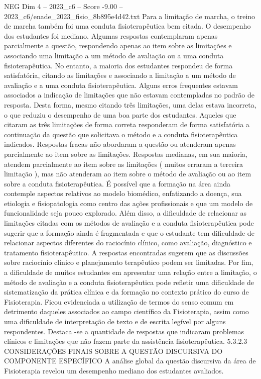 \begin{textsample}{NEG Dim 4 – 2023\_c6 – Score -9.00 – 2023\_c6/enade\_2023\_fisio\_8b895e4d42.txt}
Para a limitação de marcha, o treino de marcha também foi uma conduta fisioterapêutica bem citada.
O desempenho dos estudantes foi mediano.
Algumas respostas contemplaram apenas parcialmente a questão, respondendo apenas ao item sobre as limitações e associando uma limitação a um método de avaliação ou a uma conduta fisioterapêutica.
No entanto, a maioria dos estudantes respondeu de forma satisfatória, citando as limitações e associando a limitação a um método de avaliação e a uma conduta fisioterapêutica.
Alguns erros frequentes estavam associados a indicação de limitações que não estavam contempladas no padrão de resposta.
Desta forma, mesmo citando três limitações, uma delas estava incorreta, o que reduziu o desempenho de uma boa parte dos estudantes.
Aqueles que citaram as três limitações de forma correta responderam de forma satisfatória a continuação da questão que solicitava o método e a conduta fisioterapêutica indicados.
Respostas fracas não abordaram a questão ou atenderam apenas parcialmente ao item sobre as limitações.
Respostas medianas, em sua maioria, atendem parcialmente ao item sobre as limitações ( muitos erraram a terceira limitação ), mas não atenderam ao item sobre o método de avaliação ou ao item sobre a conduta fisioterapêutica.
É possível que a formação na área ainda contemple aspectos relativos ao modelo biomédico, enfatizando a doença, sua etiologia e fisiopatologia como centro das ações profissionais e que um modelo de funcionalidade seja pouco explorado.
Além disso, a dificuldade de relacionar as limitações citadas com os métodos de avaliação e a conduta fisioterapêutica pode sugerir que a formação ainda é fragmentada e que o estudante tem dificuldade de relacionar aspectos diferentes do raciocínio clínico, como avaliação, diagnóstico e tratamento fisioterapêutico.
A respostas encontradas sugerem que as discussões sobre raciocínio clínico e planejamento terapêutico podem ser limitadas.
Por fim, a dificuldade de muitos estudantes em apresentar uma relação entre a limitação, o método de avaliação e a conduta fisioterapêutica pode refletir uma dificuldade de sistematização da prática clínica e da formação no contexto prático do curso de Fisioterapia.
Ficou evidenciada a utilização de termos do senso comum em detrimento daqueles associados ao campo científico da Fisioterapia, assim como uma dificuldade de interpretação de texto e de escrita legível por alguns respondentes.
Destaca -se a quantidade de respostas que indicaram problemas clínicos e limitações que não fazem parte da assistência fisioterapêutica. 5.3.2.3 CONSIDERAÇÕES FINAIS SOBRE A QUESTÃO DISCURSIVA DO COMPONENTE ESPECÍFICO A análise global da questão discursiva da área de Fisioterapia revelou um desempenho mediano dos estudantes avaliados.

\end{textsample}
